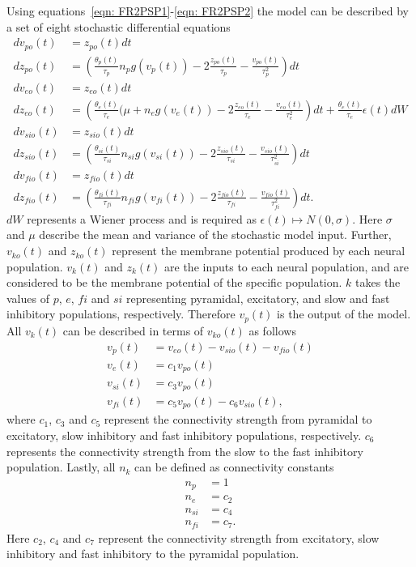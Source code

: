 Using equations~\ref{eqn: FR2PSP1}-\ref{eqn: FR2PSP2} the model can be described by a set of eight stochastic differential equations \begin{align}%
dv_{po}(t)&= z_{po}(t)dt\\
dz_{po}(t)&=\left(\frac{\theta_{p}(t)}{\tau_{p}}n_{p}g(v_{p}(t))-2\frac{z_{po}(t)}{\tau_{p}}-\frac{v_{po}(t)}{\tau_{p}^{2}}\right)dt\\
dv_{eo}(t)&= z_{eo}(t)dt\\
dz_{eo}(t)&=\left(\frac{\theta_{e}(t)}{\tau_{e}}(\mu +n_{e}g(v_{e}(t))-2\frac{z_{eo}(t)}{\tau_{e}}-\frac{v_{eo}(t)}{\tau_{e}^{2}}\right)dt + \frac{\theta_{e}(t)}{\tau_{e}}\epsilon(t)dW\\
dv_{sio}(t)&= z_{sio}(t)dt\\
dz_{sio}(t)&=\left(\frac{\theta_{si}(t)}{\tau_{si}}n_{si}g(v_{si}(t))-2\frac{z_{sio}(t)}{\tau_{si}}-\frac{v_{sio}(t)}{\tau_{si}^{2}}\right)dt\\
dv_{fio}(t)&= z_{fio}(t)dt\\
dz_{fio}(t)&=\left(\frac{\theta_{fi}(t)}{\tau_{fi}}n_{fi}g(v_{fi}(t))-2\frac{z_{fio}(t)}{\tau_{fi}}-\frac{v_{fio}(t)}{\tau_{fi}^{2}}\right)dt.
\end{align} $dW$ represents a Wiener process and is required as $\epsilon(t)\longmapsto N(0,\sigma)$. Here $\sigma$ and $\mu$ describe the mean and variance of the stochastic model input. Further, $v_{ko}(t) $ and $z_{ko}(t) $ represent the membrane potential produced by each neural population. $v_{k}(t) $ and $z_{k}(t) $ are the inputs to each neural population, and are considered to be the membrane potential of the specific population. $k$ takes the values of $p$, $e$, $fi$ and $si$ representing pyramidal, excitatory, and slow and fast inhibitory populations, respectively. Therefore $v_{p}(t) $ is the output of the model. All $v_{k}(t) $ can be described in terms of $v_{ko}(t) $ as follows \begin{align}%
v_{p}(t) &= v_{eo}(t)-v_{sio}(t)-v_{fio}(t)\\
v_{e}(t) &= c_{1}v_{po}(t)\\
v_{si}(t) &= c_{3}v_{po}(t)\\
v_{fi}(t) &= c_{5}v_{po}(t)-c_{6}v_{sio}(t),
\end{align} where $c_{1}$, $c_{3}$ and $c_{5}$ represent the connectivity strength from pyramidal to excitatory, slow inhibitory and fast inhibitory populations, respectively. $c_{6}$ represents the connectivity strength from the slow to the fast inhibitory population. Lastly, all $n_{k}$ can be defined as connectivity constants \begin{align}%
n_{p} &=1\\
n_{e} &=c_{2}\\
n_{si} &=c_{4}\\
n_{fi} &=c_{7}.
\end{align} Here $c_{2}$, $c_4$ and $c_7$ represent the connectivity strength from excitatory, slow inhibitory and fast inhibitory to the pyramidal population.

